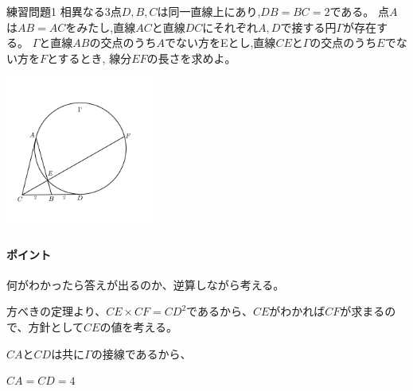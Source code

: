 \documentclass[uplatex,fleqn]{jsbook}
\begin{document}
\begin{problem}{練習問題1}
    相異なる3点$D,B,C$は同一直線上にあり,$DB=BC=2$である。
    点$A$は$AB=AC$をみたし,直線$AC$と直線$DC$にそれぞれ$A,D$で接する円$\Gamma$が存在する。
    $\Gamma$と直線$AB$の交点のうち$A$でない方をEとし,直線$CE$と$\Gamma$の交点のうち$E$でない方を$F$とするとき,
    線分$EF$の長さを求めよ。

    \includegraphics[clip,height=5cm]{figures/practice1.pdf}

\end{problem}

\paragraph{ポイント} 何がわかったら答えが出るのか、逆算しながら考える。

\begin{answer}
    方べきの定理より、$CE\times CF=CD^2$であるから、$CE$がわかれば$CF$が求まるので、方針として$CE$の値を考える。

    $CA$と$CD$は共に$\Gamma$の接線であるから、

    $CA=CD=4$

\end{answer}
\end{document}

